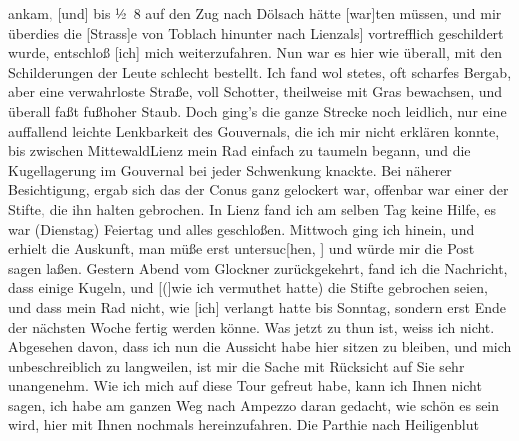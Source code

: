 \begin{ledgroupsized}[t]{13cm}
                  ankam\textcolor{gray}{,}{ }{[}und{]} bis ½ 8 auf den Zug nach Dölsach hätte {[}war{]}ten müssen, und mir
               überdies die {[}Strass{]}e von Toblach hinunter nach Lienz\oindex{Lienz@\textbf{Lienz}|pw}{[}als{]} vortrefflich geschildert wurde, entschloß
                  {[}ich{]} mich weiterzufahren. Nun war es hier {\pb}wie überall, mit den
               Schilderungen der Leute schlecht bestellt. Ich fand wol stetes, oft scharfes Bergab,
               aber eine verwahrloste Straße, voll Schotter, theilweise mit Gras bewachsen, und
               überall faßt fußhoher Staub. Doch ging’s die ganze Strecke noch leidlich, nur eine
               auffallend leichte Lenkbarkeit des Gouvernals, die ich mir nicht erklären konnte, bis
               zwischen MittewaldLienz mein Rad einfach zu taumeln begann, und die
               Kugellagerung im Gouvernal bei jeder Schwenkung knackte. Bei näherer Besichtigung,
               ergab sich das der Conus ganz gelockert war, offenbar war einer der
                  Stifte\textcolor{gray}{,} die ihn halten gebrochen. In Lienz fand ich am selben
               Tag keine Hilfe, es war (Dienstag) Feiertag und alles geschloßen.
               Mittwoch ging ich hinein, und erhielt die Auskunft, man müße erst
                  untersuc{[}hen, {]} und würde mir die Post sagen laßen. Gestern
               Abend vom Glockner zurückgekehrt, fand ich die
               Nachricht, dass einige Kugeln, und {[}({]}wie ich vermuthet hatte) die
               Stifte gebrochen seien, und dass mein Rad nicht, wie {[}ich{]}{ }{\pb}verlangt
               hatte bis Sonntag, sondern erst Ende der nächsten Woche fertig
               werden könne. Was jetzt zu thun ist, weiss ich nicht. Abgesehen
                  davon, dass ich nun die Aussicht habe hier
                  sitzen zu bleiben, und mich unbeschreiblich zu
                  langweilen, ist mir die Sache mit Rücksicht auf Sie sehr
               unangenehm. Wie ich mich auf diese Tour gefreut habe, kann
                  ich Ihnen nicht sagen, ich habe am
               ganzen Weg nach Ampezzo
               daran gedacht, wie schön es sein wird, hier mit Ihnen nochmals
               hereinzufahren. Die Parthie nach Heiligenblut

\end{ledgroupsized}
